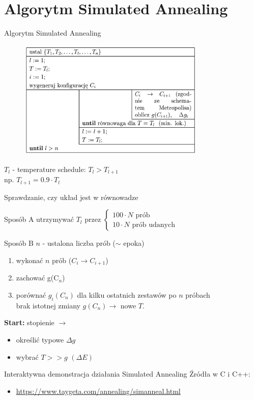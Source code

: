 \section{Algorytm Simulated Annealing}

	
	\begin{frame}{Algorytm Simulated Annealing}
		\begin{figure}
			\includegraphics[width=0.8\textwidth]{img/18/sa_algorithm}
		\end{figure}
		$T_l$ - temperature schedule: $T_l > T_{l+1}$\\
		np. $T_{l+1} = 0.9 \cdot T_l$
	\end{frame}

	\begin{frame}{Sprawdzanie, czy układ jest w równowadze}
		\begin{block}{Sposób A}
			utrzymywać $T_l$ przez $\begin{cases}
			100 \cdot N \text{ prób} \\
			10 \cdot N \text{ prób udanych}
			\end{cases}$
		\end{block}
		
		\begin{block}{Sposób B}
		$n$ - ustalona liczba prób ($\sim$ epoka)
		\begin{enumerate}
			\item wykonać $n$ prób ($C_i \rightarrow C_{i+1}$)
			\item zachować g(C$_n$)
			\item porównać $g_i(C_n)$ dla kilku ostatnich zestawów po $n$ próbach \\
			brak istotnej zmiany $g(C_n) \rightarrow$ nowe $T$.
		\end{enumerate}
		\end{block}
		\textbf{Start:} stopienie $\rightarrow$ 
		\begin{itemize}
			\item określić typowe $\Delta g$
			\item wybrać $T >> g$ $(\Delta E)$
		\end{itemize}
		
		
	\end{frame}
	
	\begin{frame}{Interaktywna demonstracja działania Simulated Annealing}
		Źródła w C i C++:
		\begin{itemize}
			\item 	\url{https://www.taygeta.com/annealing/simanneal.html}
		\end{itemize}
		
		
	\end{frame}


